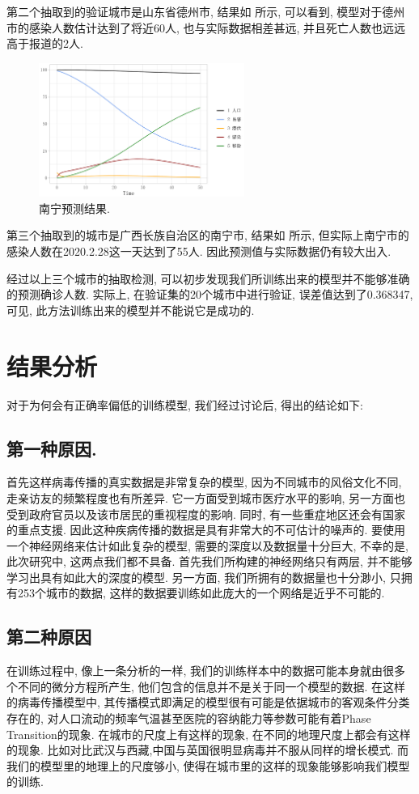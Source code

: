 \documentclass[lang=cn,11pt]{elegantpaper}
\begin{document}
第二个抽取到的验证城市是山东省德州市, 结果如  所示, 可以看到, 模型对于德州市的感染人数估计达到了将近60人, 也与实际数据相差甚远, 并且死亡人数也远远高于报道的2人.  
\begin{figure}[htbp]
  \centering
  \hspace{25pt}\includegraphics[width=0.6\textwidth]{nn}
  \caption{南宁预测结果. \label{fig:nn}}
\end{figure}

第三个抽取到的城市是广西长族自治区的南宁市, 结果如 所示, 但实际上南宁市的感染人数在2020.2.28这一天达到了55人. 因此预测值与实际数据仍有较大出入.

经过以上三个城市的抽取检测, 可以初步发现我们所训练出来的模型并不能够准确的预测确诊人数. 实际上, 在验证集的20个城市中进行验证, 误差值达到了0.368347, 可见, 此方法训练出来的模型并不能说它是成功的.

\section{结果分析}
对于为何会有正确率偏低的训练模型, 我们经过讨论后, 得出的结论如下:

\subsection*{第一种原因.}
 首先这样病毒传播的真实数据是非常复杂的模型, 因为不同城市的风俗文化不同, 走亲访友的频繁程度也有所差异. 它一方面受到城市医疗水平的影响, 另一方面也受到政府官员以及该市居民的重视程度的影响. 同时, 有一些重症地区还会有国家的重点支援. 因此这种疾病传播的数据是具有非常大的不可估计的噪声的.  要使用一个神经网络来估计如此复杂的模型, 需要的深度以及数据量十分巨大, 不幸的是, 此次研究中, 这两点我们都不具备. 首先我们所构建的神经网络只有两层, 并不能够学习出具有如此大的深度的模型. 另一方面, 我们所拥有的数据量也十分渺小, 只拥有253个城市的数据, 这样的数据要训练如此庞大的一个网络是近乎不可能的. 
\subsection{第二种原因}
 在训练过程中, 像上一条分析的一样, 我们的训练样本中的数据可能本身就由很多个不同的微分方程所产生, 他们包含的信息并不是关于同一个模型的数据. 在这样的病毒传播模型中, 其传播模式即满足的模型很有可能是依据城市的客观条件分类存在的, 对人口流动的频率气温甚至医院的容纳能力等参数可能有着Phase Transition的现象. 在城市的尺度上有这样的现象, 在不同的地理尺度上都会有这样的现象. 比如对比武汉与西藏,中国与英国很明显病毒并不服从同样的增长模式. 而我们的模型里的地理上的尺度够小, 使得在城市里的这样的现象能够影响我们模型的训练.
\end{document}
